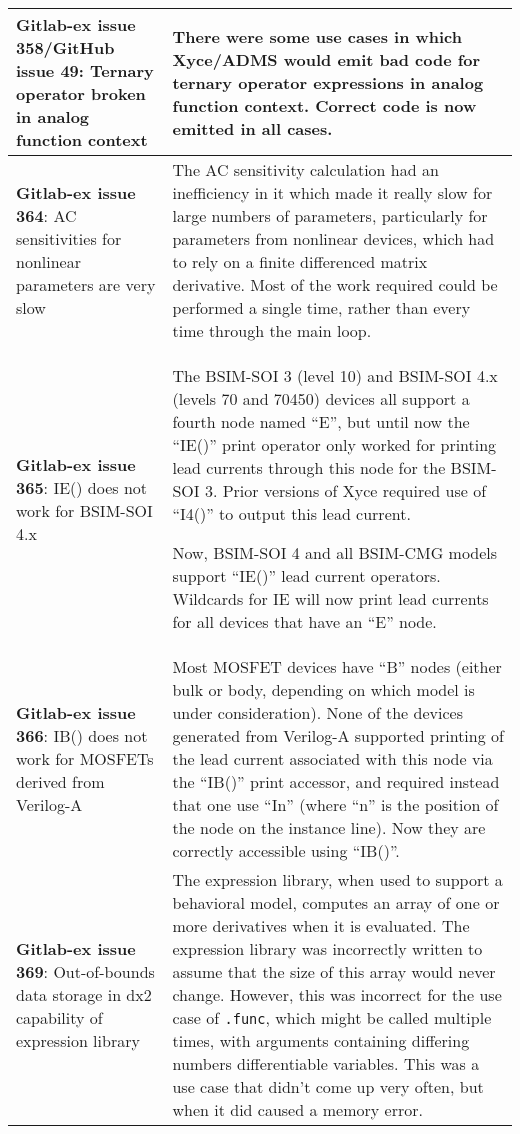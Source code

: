 {\begin{longtable}[h] {>{\raggedright\small}m{2in}|>{\raggedright\let\\\tabularnewline\small}m{3.5in}}
\textbf{Gitlab-ex issue 358/GitHub issue 49}: Ternary operator broken in
analog function context & There were some use cases in which Xyce/ADMS
would emit bad code for ternary operator expressions in analog
function context.  Correct code is now emitted in all
cases.  \\ \hline

\textbf{Gitlab-ex issue 364}:  AC sensitivities for nonlinear parameters are very slow &
 The AC sensitivity calculation had an inefficiency in it which made
 it really slow for large numbers of parameters, particularly for
 parameters from nonlinear devices, which had to rely on a finite
 differenced matrix derivative.  Most of the work required could be
 performed a single time, rather than every time through the main
 loop.  \\ \hline

\textbf{Gitlab-ex issue 365}: IE() does not work for BSIM-SOI 4.x
& The BSIM-SOI 3 (level 10) and BSIM-SOI 4.x (levels 70 and 70450)
devices all support a fourth node named ``E'', but until now the
``IE()'' print operator only worked for printing lead currents through
this node for the BSIM-SOI 3.  Prior versions of Xyce required use of
``I4()'' to output this lead current.

Now, BSIM-SOI 4 and all BSIM-CMG models support ``IE()'' lead current
operators.  Wildcards for IE will now print lead currents for all
devices that have an ``E'' node. \\ \hline

\textbf{Gitlab-ex issue 366}: IB() does not work for MOSFETs derived from Verilog-A
& Most MOSFET devices have ``B'' nodes (either bulk or body, depending
on which model is under consideration).  None of the devices generated
from Verilog-A supported printing of the lead current associated with
this node via the ``IB()'' print accessor, and required instead that
one use ``In'' (where ``n'' is the position of the node on the
instance line).  Now they are correctly accessible using ``IB()''. \\
\hline

\textbf{Gitlab-ex issue 369}:  Out-of-bounds data storage in dx2 capability of expression library  &
The expression library, when used to support a behavioral model,
computes an array of one or more derivatives when it is evaluated.
The expression library was incorrectly written to assume that the size
of this array would never change.  However, this was incorrect for the
use case of \texttt{.func}, which might be called multiple times, with
arguments containing differing numbers differentiable variables.  This
was a use case that didn't come up very often, but when it did caused
a memory error.\\ \hline


\end{longtable}}
